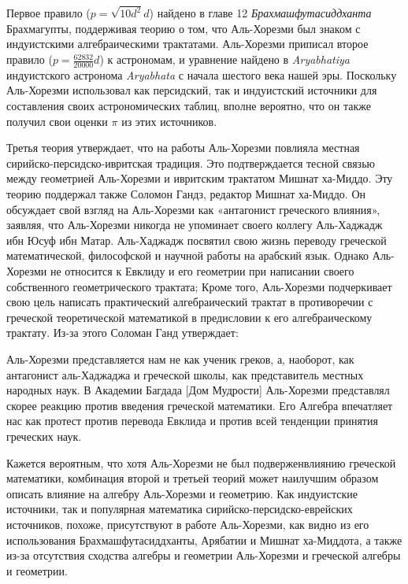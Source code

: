 Первое правило ($p = \sqrt{10d^2}d$) найдено в главе 12 \textit{Брахмашфутасиддханта} Брахмагупты, поддерживая теорию о том, что Аль-Хорезми был знаком с индуистскими алгебраическими трактатами. Аль-Хорезми
приписал второе правило ($p = \frac{62832}{20000}d$) к астрономам, и уравнение найдено в \textit{Aryabhatiya} индуистского астронома \textit{Aryabhata} с начала шестого века нашей эры. Поскольку Аль-Хорезми использовал как персидский, так и индуистский источники для составления своих астрономических таблиц, вполне вероятно, что он также получил свои оценки $\pi$ из этих источников.

Третья теория утверждает, что на работы Аль-Хорезми повлияла местная сирийско-персидско-ивритская традиция. Это подтверждается тесной связью между геометрией Аль-Хорезми и ивритским трактатом Мишнат ха-Миддо. Эту теорию поддержал также Соломон Гандз, редактор Мишнат ха-Миддо. Он обсуждает свой взгляд на Аль-Хорезми как «антагонист греческого влияния», заявляя, что Аль-Хорезми никогда не упоминает своего коллегу Аль-Хаджадж ибн Юсуф ибн Матар. Аль-Хаджадж посвятил свою жизнь переводу греческой математической, философской и научной работы на арабский язык. Однако Аль-Хорезми не относится к Евклиду и его геометрии при написании своего собственного геометрического трактата; Кроме того, Аль-Хорезми подчеркивает свою цель написать практический алгебраический трактат в противоречии с греческой теоретической математикой в предисловии к его алгебраическому трактату. Из-за этого Соломан Ганд утверждает:

\begin{displayquote}
Аль-Хорезми представляется нам не как ученик греков, а, наоборот, как антагонист аль-Хаджаджа и греческой школы, как представитель местных народных наук. В Академии Багдада [Дом Мудрости] Аль-Хорезми представлял скорее реакцию против введения греческой математики. Его Алгебра впечатляет нас как протест против перевода Евклида и против всей тенденции принятия греческих наук.
\end{displayquote}

Кажется вероятным, что хотя Аль-Хорезми не был подверженвлиянию греческой математики, комбинация второй и третьей теорий может наилучшим образом описать влияние на алгебру Аль-Хорезми и геометрию. Как индуистские источники, так и популярная математика сирийско-персидско-еврейских источников, похоже, присутствуют в работе Аль-Хорезми, как видно из его использования Брахмашфутасиддханты, Арябатии и Мишнат ха-Миддота, а также из-за отсутствия сходства алгебры и геометрии Аль-Хорезми и греческой алгебры и геометрии.

